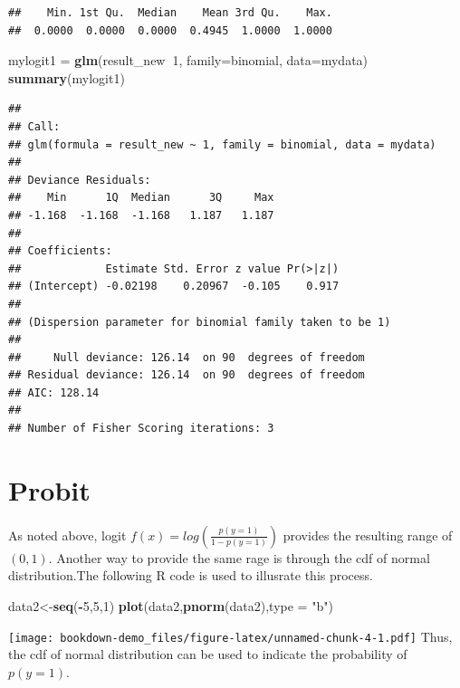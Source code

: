 \documentclass[]{book}
\newenvironment{Shaded}{\begin{snugshade}}{\end{snugshade}}
\newcommand{\DataTypeTok}[1]{\textcolor[rgb]{0.13,0.29,0.53}{#1}}
\newcommand{\DecValTok}[1]{\textcolor[rgb]{0.00,0.00,0.81}{#1}}
\newcommand{\KeywordTok}[1]{\textcolor[rgb]{0.13,0.29,0.53}{\textbf{#1}}}
\newcommand{\NormalTok}[1]{#1}
\newcommand{\OperatorTok}[1]{\textcolor[rgb]{0.81,0.36,0.00}{\textbf{#1}}}
\newcommand{\StringTok}[1]{\textcolor[rgb]{0.31,0.60,0.02}{#1}}
\begin{document}
\begin{verbatim}
##    Min. 1st Qu.  Median    Mean 3rd Qu.    Max. 
##  0.0000  0.0000  0.0000  0.4945  1.0000  1.0000
\end{verbatim}

\begin{Shaded}
\begin{Highlighting}[]
\NormalTok{mylogit1 =}\StringTok{ }\KeywordTok{glm}\NormalTok{(result_new}\OperatorTok{~}\DecValTok{1}\NormalTok{, }\DataTypeTok{family=}\NormalTok{binomial, }\DataTypeTok{data=}\NormalTok{mydata)}
\KeywordTok{summary}\NormalTok{(mylogit1)}
\end{Highlighting}
\end{Shaded}

\begin{verbatim}
## 
## Call:
## glm(formula = result_new ~ 1, family = binomial, data = mydata)
## 
## Deviance Residuals: 
##    Min      1Q  Median      3Q     Max  
## -1.168  -1.168  -1.168   1.187   1.187  
## 
## Coefficients:
##             Estimate Std. Error z value Pr(>|z|)
## (Intercept) -0.02198    0.20967  -0.105    0.917
## 
## (Dispersion parameter for binomial family taken to be 1)
## 
##     Null deviance: 126.14  on 90  degrees of freedom
## Residual deviance: 126.14  on 90  degrees of freedom
## AIC: 128.14
## 
## Number of Fisher Scoring iterations: 3
\end{verbatim}

\hypertarget{probit}{%
\section{Probit}\label{probit}}

As noted above, logit \(f(x)=log(\frac{p(y=1)}{1-p(y=1)})\) provides the resulting range of \((0,1)\). Another way to provide the same rage is through the cdf of normal distribution.The following R code is used to illusrate this process.

\begin{Shaded}
\begin{Highlighting}[]
\NormalTok{data2<-}\KeywordTok{seq}\NormalTok{(}\OperatorTok{-}\DecValTok{5}\NormalTok{,}\DecValTok{5}\NormalTok{,}\DecValTok{1}\NormalTok{)}
\KeywordTok{plot}\NormalTok{(data2,}\KeywordTok{pnorm}\NormalTok{(data2),}\DataTypeTok{type =} \StringTok{"b"}\NormalTok{)}
\end{Highlighting}
\end{Shaded}

\texttt{[image: bookdown-demo\_files/figure-latex/unnamed-chunk-4-1.pdf]}
Thus, the cdf of normal distribution can be used to indicate the probability of \(p(y=1)\).
\end{document}
